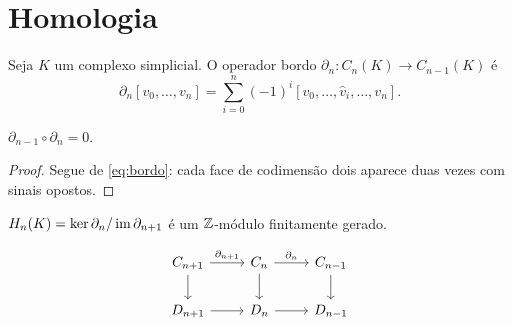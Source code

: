 \section{Homologia}\label{sec:homologia}

\begin{definition}\label{def:bordo}
Seja $K$ um complexo simplicial. O operador bordo $\partial_n \colon C_n(K) \to C_{n-1}(K)$ é
\begin{equation}\label{eq:bordo}
  \partial_n [v_0, \dots, v_n] = \sum_{i=0}^{n} (-1)^i [v_0, \dots, \hat{v}_i, \dots, v_n].
\end{equation}
\end{definition}

\begin{lemma}\label{lem:dd}
$\partial_{n-1} \circ \partial_n = 0$.
\end{lemma}

\begin{proof}
Segue de \eqref{eq:bordo}: cada face de codimensão dois aparece duas vezes com sinais opostos.
\end{proof}

\begin{theorem}
$H_n(K) = \ker \partial_n / \operatorname{im} \partial_{n+1}$ é um $\mathbb{Z}$-módulo finitamente gerado.
\end{theorem}

\[
\begin{tikzcd}
  C_{n+1} \arrow[r, "\partial_{n+1}"] \arrow[d] & C_n \arrow[r, "\partial_n"] \arrow[d] & C_{n-1} \arrow[d] \\
  D_{n+1} \arrow[r] & D_n \arrow[r] & D_{n-1}
\end{tikzcd}
\]
